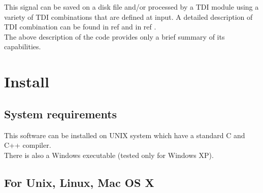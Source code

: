 \documentclass[a4paper,english,12pt]{article}
\begin{document}
This signal can be saved on a disk file and/or processed by a TDI module using a variety of TDI combinations that are defined at input. A  detailed description of TDI combination can be found in ref \cite{TDIVinet} and in ref \cite{TDITinto}. \\

The above description of the code provides only a brief summary of its capabilities. 

\newpage

\section{Install}
\label{SInstall}
\subsection{System requirements}
\label{SSSystReq}
This software can be installed on UNIX system which have a standard C and C++ compiler.\\
There is also a Windows executable (tested only for Windows XP).\\ 

%
%
\subsection{For Unix, Linux, Mac OS X}
\label{SSInstallUNIX}
\end{document}
